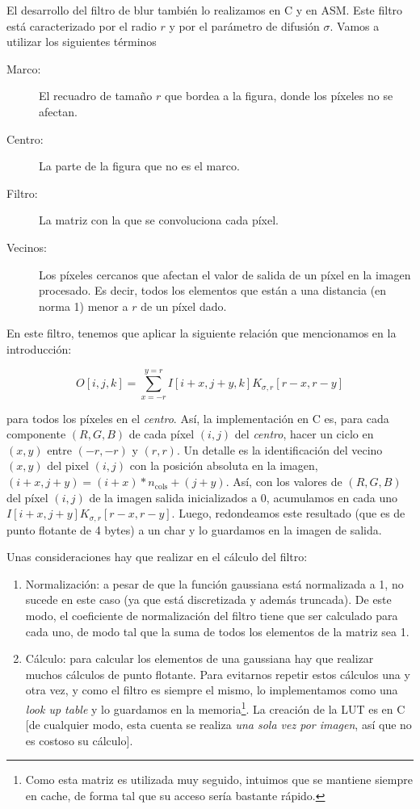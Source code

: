 El desarrollo del filtro de {\ttfamily blur} también lo realizamos en
C y en ASM. Este filtro está caracterizado por el radio $r$ y por el
parámetro de difusión $\sigma$. Vamos a utilizar los siguientes
términos

\begin{description}
\item[Marco:] El recuadro de tamaño $r$ que bordea a la figura, donde
  los píxeles no se afectan.
\item[Centro:] La parte de la figura que no es el marco.
\item[Filtro:] La matriz con la que se convoluciona cada píxel.
\item[Vecinos:] Los píxeles cercanos que afectan el valor de salida de
  un píxel en la imagen procesado. Es decir, todos los elementos que
  están a una distancia (en norma 1) menor a $r$ de un píxel dado.
\end{description}

En este filtro, tenemos que aplicar la siguiente relación que
mencionamos en la introducción:

\begin{equation}
  O[i, j, k] = \sum_{x=-r}^{y=r} I[i+x, j+y, k] K_{\sigma, r} [r-x, r-y]
  \label{eq:blur}
\end{equation}

para todos los píxeles en el \emph{centro}. Así, la implementación en
C es, para cada componente $(R, G, B)$ de cada píxel $(i, j)$ del
\emph{centro}, hacer un ciclo en $(x, y)$ entre $(-r, -r)$ y $(r,r)$.
Un detalle es la identificación del vecino $(x, y)$ del pixel $(i, j)$
con la posición absoluta en la imagen,
$(i + x, j + y) = (i + x)*n_{\text{cols}} + (j + y)$. Así, con los
valores de $(R, G, B)$ del píxel $(i, j)$ de la imagen salida
inicializados a 0, acumulamos en cada uno
$ I[i+x, j+y] K_{\sigma, r} [r-x, r-y]$. Luego, redondeamos este
resultado (que es de punto flotante de 4 bytes) a un char y lo
guardamos en la imagen de salida.

Unas consideraciones hay que realizar en el cálculo del filtro:

\begin{enumerate}
\item Normalización: a pesar de que la función gaussiana está
  normalizada a 1, no sucede en este caso (ya que está discretizada y
  además truncada). De este modo, el coeficiente de normalización del
  filtro tiene que ser calculado para cada uno, de modo tal que la
  suma de todos los elementos de la matriz sea 1.

\item Cálculo: para calcular los elementos de una gaussiana hay que
  realizar muchos cálculos de punto flotante. Para evitarnos repetir
  estos cálculos una y otra vez, y como el filtro es siempre el mismo,
  lo implementamos como una \emph{look up table} y lo guardamos en la
  memoria\footnote{Como esta matriz es utilizada muy seguido, intuimos
    que se mantiene siempre en cache, de forma tal que su acceso sería
    bastante rápido.}. La creación de la LUT es en C [de cualquier
  modo, esta cuenta se realiza \emph{una sola vez por imagen}, así que
  no es costoso su cálculo].
\end{enumerate}

